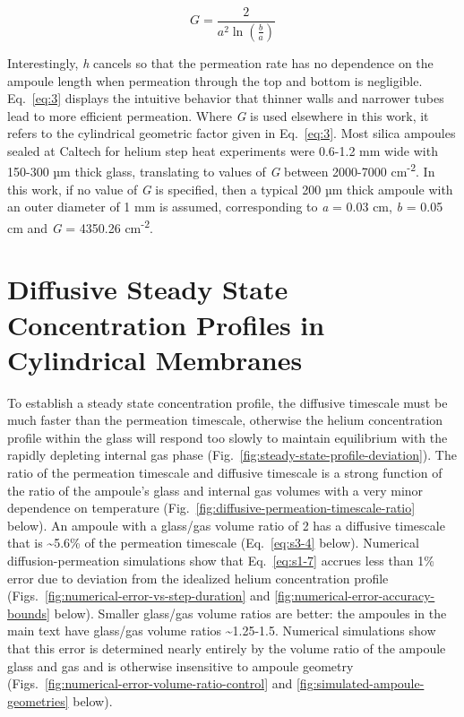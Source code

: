 \begin{equation}
G = \frac{2}{a^{2}\ln\left( \frac{b}{a} \right)}
\label{eq:3}
\end{equation}

Interestingly, \emph{h} cancels so that the permeation rate has no
dependence on the ampoule length when permeation through the top and
bottom is negligible. Eq.~\eqref{eq:3} displays the intuitive behavior that
thinner walls and narrower tubes lead to more efficient permeation.
Where \emph{G} is used elsewhere in this work, it refers to the
cylindrical geometric factor given in Eq.~\eqref{eq:3}. Most silica ampoules
sealed at Caltech for helium step heat experiments were 0.6-1.2 mm wide
with 150-300 µm thick glass, translating to values of \emph{G} between
2000-7000 cm\textsuperscript{-2}. In this work, if no value of \emph{G}
is specified, then a typical 200 µm thick ampoule with an outer diameter
of 1 mm is assumed, corresponding to \emph{a} = 0.03 cm, \emph{b} = 0.05
cm and \emph{G} = 4350.26 cm\textsuperscript{-2}.

\section{Diffusive Steady State Concentration Profiles in Cylindrical
Membranes}\label{diffusive-steady-state-concentration-profiles-in-cylindrical-membranes}

To establish a steady state concentration profile, the diffusive timescale must be much faster than the permeation timescale, otherwise the helium concentration profile within the glass will respond too slowly to maintain equilibrium with the rapidly depleting internal gas phase (Fig.~\ref{fig:steady-state-profile-deviation}). The ratio of the permeation timescale and diffusive timescale is a strong function of the ratio of the ampoule's glass and internal gas volumes with a very minor dependence on temperature (Fig.~\ref{fig:diffusive-permeation-timescale-ratio} below). An ampoule with a glass/gas volume ratio of 2 has a diffusive timescale that is \textasciitilde5.6\% of the permeation timescale (Eq.~\eqref{eq:s3-4} below). Numerical diffusion-permeation simulations show that Eq.~\eqref{eq:s1-7} accrues less than 1\% error due to deviation from the idealized helium concentration profile (Figs.~\ref{fig:numerical-error-vs-step-duration} and \ref{fig:numerical-error-accuracy-bounds} below). Smaller glass/gas volume ratios are better: the ampoules in the main text have glass/gas volume ratios \textasciitilde1.25-1.5. Numerical simulations show that this error is determined nearly entirely by the volume ratio of the ampoule glass and gas and is otherwise insensitive to ampoule geometry (Figs.~\ref{fig:numerical-error-volume-ratio-control} and \ref{fig:simulated-ampoule-geometries} below).

